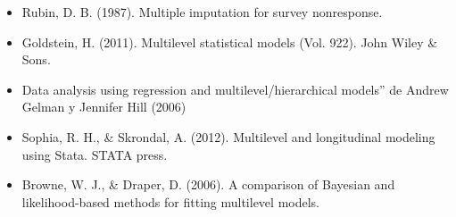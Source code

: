 \documentclass[
  12pt,
]{book}
\begin{document}
\begin{itemize}
\item
  Rubin, D. B. (1987). Multiple imputation for survey nonresponse.
\item
  Goldstein, H. (2011). Multilevel statistical models (Vol. 922). John Wiley \& Sons.
\item
  Data analysis using regression and multilevel/hierarchical models'' de Andrew Gelman y Jennifer Hill (2006)
\item
  Sophia, R. H., \& Skrondal, A. (2012). Multilevel and longitudinal modeling using Stata. STATA press.
\item
  Browne, W. J., \& Draper, D. (2006). A comparison of Bayesian and likelihood-based methods for fitting multilevel models.
\end{itemize}
\end{document}
